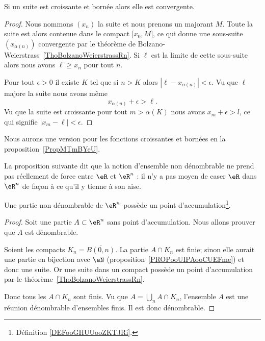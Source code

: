\begin{corollary}   \label{CorFHbMqGGyi}
    Si un suite est croissante et bornée alors elle est convergente.
\end{corollary}

\begin{proof}
    Nous nommons \( (x_n)\) la suite et nous prenons un majorant \( M\). Toute la suite est alors contenue dans le compact \( \mathopen[ x_0 , M \mathclose]\), ce qui donne une sous-suite \( (x_{\alpha(n)})\) convergente par le théorème de Bolzano-Weierstrass~\ref{ThoBolzanoWeierstrassRn}. Si \( \ell\) est la limite de cette sous-suite alors nous avons \( \ell\geq x_n\) pour tout \( n\).

    Pour tout \( \epsilon>0\) il existe \( K\) tel que si \( n>K\) alors \( | \ell-x_{\alpha(n)} |<\epsilon\). Vu que \( \ell\) majore la suite nous avons même
    \begin{equation}
        x_{\alpha(n)}+\epsilon>\ell.
    \end{equation}
    Vu que la suite est croissante pour tout \( m>\alpha(K)\) nous avons \( x_m+\epsilon>l\), ce qui signifie \( | x_m-\ell |<\epsilon\).
\end{proof}
Nous aurons une version pour les fonctions croissantes et bornées en la proposition~\ref{PropMTmBYeU}.

La proposition suivante dit que la notion d'ensemble non dénombrable ne prend pas réellement de force entre \( \eR\) et \( \eR^n\) : il n'y a pas moyen de caser \( \eR\) dans \( \eR^n\) de façon à ce qu'il y tienne à son aise.

\begin{proposition}
    Une partie non dénombrable de \( \eR^n\) possède un point d'accumulation\footnote{Définition \ref{DEFooGHUUooZKTJRi}.}.
\end{proposition}

\begin{proof}
    Soit une partie \( A\subset \eR^n\) sans point d'accumulation. Nous allons prouver que \( A\) est dénombrable.

    Soient les compacts \( K_n=\overline{ B(0,n) }\). La partie \( A\cap K_n\) est finie; sinon elle aurait une partie en bijection avec \( \eN\) (proposition~\ref{PROPooUIPAooCUEFme}) et donc une suite. Or une suite dans un compact possède un point d'accumulation par le théorème~\ref{ThoBolzanoWeierstrassRn}.

    Donc tous les \( A\cap K_n\) sont finis. Vu que \( A=\bigcup_nA\cap K_n\), l'ensemble \( A\) est une réunion dénombrable d'ensembles finis. Il est donc dénombrable.
\end{proof}

